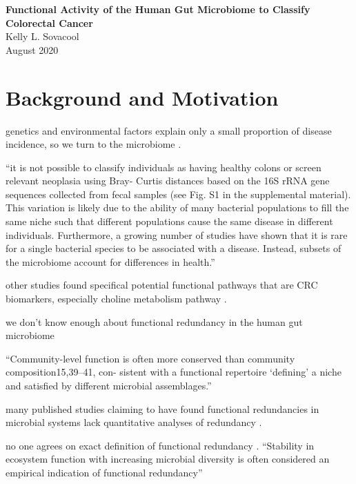 \documentclass[11pt]{article}
\begin{document}
\sloppy
\begin{center}
\large{\textbf{
    Functional Activity of the Human Gut Microbiome to Classify Colorectal Cancer
}} \\
\vspace{11pt}
\small{
    Kelly L. Sovacool \\
    August 2020
}
\end{center}



\section*{Background and Motivation} %

genetics and environmental factors explain only a small proportion of disease incidence, so we turn to the microbiome \cite{thomas_metagenomic_2019}.

``it is not possible to classify individuals as having healthy colons or screen relevant neoplasia using Bray- Curtis distances based on the 16S rRNA gene sequences collected from fecal samples (see Fig. S1 in the supplemental material). This variation is likely due to the ability of many bacterial populations to fill the same niche such that different populations cause the same disease in different individuals. Furthermore, a growing number of studies have shown that it is rare for a single bacterial species to be associated with a disease. Instead, subsets of the microbiome account for differences in health.'' \cite{topcuoglu_framework_2020}

other studies found specifical potential functional pathways that are CRC biomarkers, especially choline metabolism pathway \cite{thomas_metagenomic_2019}.


we don't know enough about functional redundancy in the human gut microbiome \cite{heintz-buschart_human_2018}

``Community-level function is often more conserved than community composition15,39–41, con- sistent with a functional repertoire ‘defining’ a niche and satisfied by different microbial assemblages.'' \cite{franzosa_species-level_2018}

many published studies claiming to have found functional redundancies in microbial systems lack quantitative analyses of redundancy \cite{souza_metagenomic_2015, ferrer_microbiota_2013}.

no one agrees on exact definition of functional redundancy \cite{louca_function_2018, heintz-buschart_human_2018, tully_dynamic_2018, royalty_quantitative_2020}.
``Stability in ecosystem function with increasing microbial diversity is often considered an empirical indication of functional redundancy''
\cite{royalty_quantitative_2020}
\end{document}
